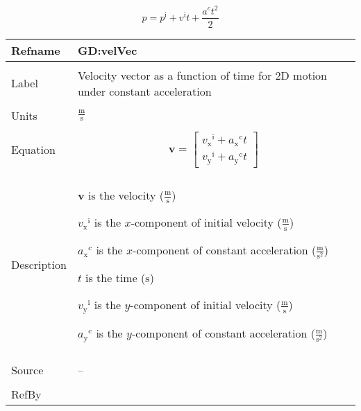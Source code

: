 \documentclass[12pt]{article}
\begin{document}
\begin{displaymath}
p={p^{\text{i}}}+{v^{\text{i}}} t+\frac{{a^{c}} t^{2}}{2}
\end{displaymath}
\vspace{\baselineskip}
\noindent
\begin{minipage}{\textwidth}
\begin{tabular}{>{\raggedright}p{}>{\raggedright\arraybackslash}p{}}
\toprule \textbf{Refname} & \textbf{GD:velVec}
\label{GD:velVec}
\\ \midrule \\
Label & Velocity vector as a function of time for 2D motion under constant acceleration
        
\\ \midrule \\
Units & $\frac{\text{m}}{\text{s}}$
        
\\ \midrule \\
Equation & \begin{displaymath}
           \mathbf{v}=\begin{bmatrix}
                      {{v_{\text{x}}}^{\text{i}}}+{{a_{\text{x}}}^{\text{c}}} t\\
                      {{v_{\text{y}}}^{\text{i}}}+{{a_{\text{y}}}^{\text{c}}} t
                      \end{bmatrix}
           \end{displaymath}
\\ \midrule \\
Description & \begin{symbDescription}
              \item{$\mathbf{v}$ is the velocity ($\frac{\text{m}}{\text{s}}$)}
              \item{${{v_{\text{x}}}^{\text{i}}}$ is the $x$-component of initial velocity ($\frac{\text{m}}{\text{s}}$)}
              \item{${{a_{\text{x}}}^{\text{c}}}$ is the $x$-component of constant acceleration ($\frac{\text{m}}{\text{s}^{2}}$)}
              \item{$t$ is the time (${\text{s}}$)}
              \item{${{v_{\text{y}}}^{\text{i}}}$ is the $y$-component of initial velocity ($\frac{\text{m}}{\text{s}}$)}
              \item{${{a_{\text{y}}}^{\text{c}}}$ is the $y$-component of constant acceleration ($\frac{\text{m}}{\text{s}^{2}}$)}
              \end{symbDescription}
\\ \midrule \\
Source & --
         
\\ \midrule \\
RefBy & 
\\ \bottomrule
\end{tabular}
\end{minipage}
\end{document}
